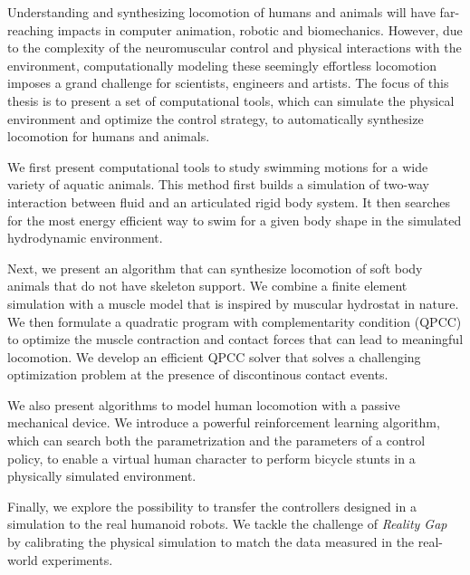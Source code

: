 Understanding and synthesizing locomotion of humans and animals will have far-reaching impacts in computer animation, robotic and biomechanics. However, due to the complexity of the neuromuscular control and physical interactions with the environment, computationally modeling these seemingly effortless locomotion imposes a grand challenge for scientists, engineers and artists. The focus of this thesis is to present a set of computational tools, which can simulate the physical environment and optimize the control strategy, to automatically synthesize locomotion for humans and animals.

We first present computational tools to study swimming motions for a wide variety of aquatic animals. This method first builds a simulation of two-way interaction between fluid and an articulated rigid body system. It then searches for the most energy efficient way to swim for a given body shape in the simulated hydrodynamic environment.

Next, we present an algorithm that can synthesize locomotion of soft body animals that do not have skeleton support. We combine a finite element simulation with a muscle model that is inspired by muscular hydrostat in nature. We then formulate a quadratic program with complementarity condition (QPCC) to optimize the muscle contraction and contact forces that can lead to meaningful locomotion. We develop an efficient QPCC solver that solves a challenging optimization problem at the presence of discontinous contact events.

We also present algorithms to model human locomotion with a passive mechanical device. We introduce a powerful reinforcement learning algorithm, which can search both the parametrization and the parameters of a control policy, to enable a virtual human character to perform bicycle stunts in a physically simulated environment.

Finally, we explore the possibility to transfer the controllers designed in a simulation to the real humanoid robots. We tackle the challenge of \emph{Reality Gap} by calibrating the physical simulation to match the data measured in the real-world experiments.
